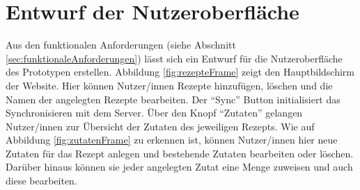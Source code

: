\documentclass[a4paper, 12pt]{scrreprt}
\begin{document}
\section{Entwurf der Nutzeroberfläche}

Aus den funktionalen Anforderungen (siehe Abschnitt \ref{sec:funktionaleAnforderungen}) lässt sich ein Entwurf für die Nutzeroberfläche des Prototypen erstellen. Abbildung \ref{fig:rezepteFrame} zeigt den Hauptbildschirm der Website. Hier können Nutzer/innen Rezepte hinzufügen, löschen und die Namen der angelegten Rezepte bearbeiten. Der \enquote{Sync} Button initialisiert das Synchronisieren mit dem Server. Über den Knopf \enquote{Zutaten} gelangen Nutzer/innen zur Übersicht der Zutaten des jeweiligen Rezepts. Wie auf Abbildung \ref{fig:zutatenFrame} zu erkennen ist, können Nutzer/innen hier neue Zutaten für das Rezept anlegen und bestehende Zutaten bearbeiten oder löschen. Darüber hinaus können sie jeder angelegten Zutat eine Menge zuweisen und auch diese bearbeiten. 
\end{document}
